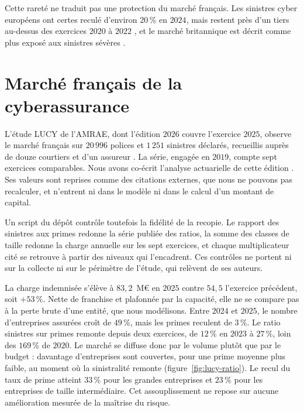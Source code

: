 Cette rareté ne traduit pas une protection du marché français. Les sinistres cyber européens
ont certes reculé d'environ $20\,\%$ en $2024$, mais restent près d'un tiers au-dessus des exercices
$2020$ à $2022$ \citep{marsh2025}, et le marché britannique est décrit comme plus exposé aux
sinistres sévères \citep{dsit2025}.

\section{Marché français de la cyberassurance}
\label{sec:marche-cyber-francais}

L'étude LUCY de l'AMRAE, dont l'édition $2026$ couvre l'exercice $2025$, observe le marché français
sur $20\,996$ polices et $1\,251$ sinistres déclarés, recueillis auprès de douze courtiers et d'un
assureur \citep{amraeLucy2026}. La série, engagée en $2019$, compte sept exercices comparables. Nous
avons co-écrit l'analyse actuarielle de cette édition \citep{RapiorKaddouri2026}. Ses valeurs sont
reprises comme des citations externes, que nous ne pouvons pas recalculer, et n'entrent ni dans le
modèle ni dans le calcul d'un montant de capital.

Un script du dépôt contrôle toutefois la fidélité
de la recopie. Le rapport des sinistres aux primes redonne la série publiée des ratios, la somme
des classes de taille redonne la charge annuelle sur les sept exercices, et chaque multiplicateur
cité se retrouve à partir des niveaux qui l'encadrent. Ces contrôles ne portent ni sur la collecte
ni sur le périmètre de l'étude, qui relèvent de ses auteurs.

La charge indemnisée s'élève à $83{,}2$~M\euro{} en $2025$ contre $54{,}5$ l'exercice précédent, soit
$+53\,\%$. Nette de franchise et plafonnée par la capacité, elle ne se compare pas à la perte brute
d'une entité, que nous modélisons. Entre $2024$ et $2025$, le nombre d'entreprises assurées croît de
$49\,\%$, mais les primes reculent de $3\,\%$. Le ratio sinistres sur primes remonte depuis
deux exercices, de $12\,\%$ en $2023$ à $27\,\%$, loin des $169\,\%$ de $2020$. Le marché se diffuse donc par le volume plutôt que par le budget :
davantage d'entreprises sont couvertes, pour une prime moyenne plus faible, au moment où la
sinistralité remonte (figure~\ref{fig:lucy-ratio}). Le recul du taux de prime atteint $33\,\%$ pour
les grandes entreprises et $23\,\%$ pour les entreprises de taille intermédiaire. Cet assouplissement
ne repose sur aucune amélioration mesurée de la maîtrise du risque.

